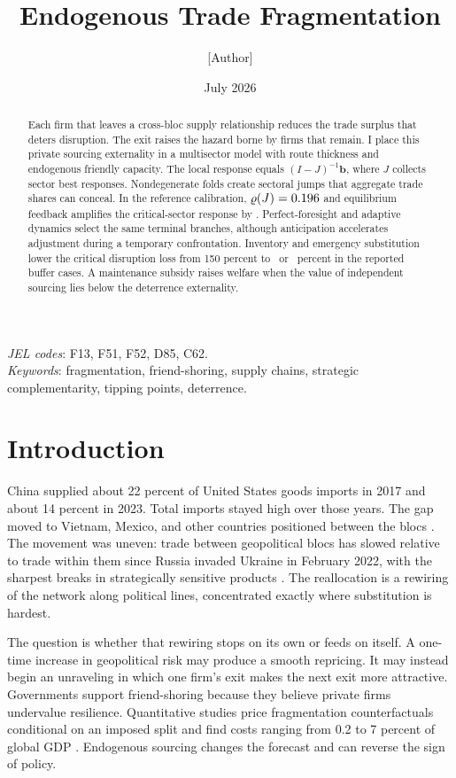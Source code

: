 \documentclass[11pt]{article}
\title{Endogenous Trade Fragmentation}
\author{[Author]}
\date{July 2026}
\theoremstyle{definition}
\begin{document}
\maketitle

\begin{abstract}
\noindent Each firm that leaves a cross-bloc supply relationship reduces the trade surplus that deters disruption. The exit raises the hazard borne by firms that remain. I place this private sourcing externality in a multisector model with route thickness and endogenous friendly capacity. The local response equals $(I-J)^{-1}\mathbf b$, where $J$ collects sector best responses. Nondegenerate folds create sectoral jumps that aggregate trade shares can conceal. In the reference calibration, $\varrho(J)=0.196$ and equilibrium feedback amplifies the critical-sector response by \MCrit. Perfect-foresight and adaptive dynamics select the same terminal branches, although anticipation accelerates adjustment during a temporary confrontation. Inventory and emergency substitution lower the critical disruption loss from 150 percent to \LamCritModeratePct\ or \LamCritStrongPct\ percent in the reported buffer cases. A maintenance subsidy raises welfare when the value of independent sourcing lies below the deterrence externality.
\end{abstract}

\medskip
\noindent\textit{JEL codes}: F13, F51, F52, D85, C62.\\
\noindent\textit{Keywords}: fragmentation, friend-shoring, supply chains, strategic complementarity, tipping points, deterrence.

\section{Introduction}\label{sec:intro}

China supplied about 22 percent of United States goods imports in 2017 and about 14 percent in 2023. Total imports stayed high over those years. The gap moved to Vietnam, Mexico, and other countries positioned between the blocs \citep{AlfaroChor2023, FreundEtAl2023}. The movement was uneven: trade between geopolitical blocs has slowed relative to trade within them since Russia invaded Ukraine in February 2022, with the sharpest breaks in strategically sensitive products \citep{GopinathEtAl2025JIE}. The reallocation is a rewiring of the network along political lines, concentrated exactly where substitution is hardest.

The question is whether that rewiring stops on its own or feeds on itself. A one-time increase in geopolitical risk may produce a smooth repricing. It may instead begin an unraveling in which one firm's exit makes the next exit more attractive. Governments support friend-shoring because they believe private firms undervalue resilience. Quantitative studies price fragmentation counterfactuals conditional on an imposed split and find costs ranging from 0.2 to 7 percent of global GDP \citep{AiyarEtAl2023, BaqaeeEtAl2024, AttinasiBoeckelmannMeunier2023}. Endogenous sourcing changes the forecast and can reverse the sign of policy.
\end{document}
